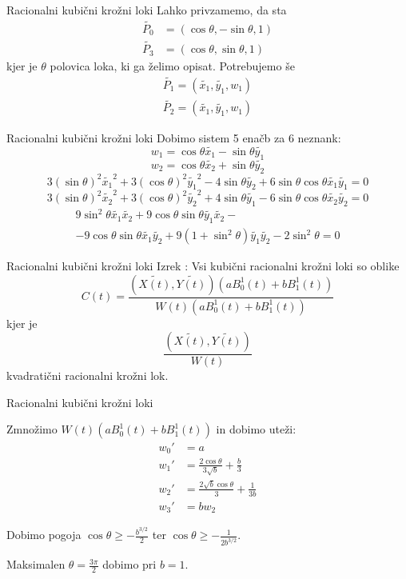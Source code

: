 \documentclass[t]{beamer}
\begin{document}
\begin{frame}{Racionalni kubični krožni loki}
Lahko privzamemo, da sta 
\begin{align*}
\tilde{P_{0}} &= (\cos \theta, - \sin \theta, 1) \\
\tilde{P_{3}} &= (\cos \theta, \sin \theta, 1)
\end{align*}
kjer je $\theta$ polovica loka, ki ga želimo opisat. 
Potrebujemo še 
\begin{align*}
\tilde{P_{1}} = (\tilde{x_{1}}, \tilde{y_{1}}, w_{1}) \\
\tilde{P_{2}} = (\tilde{x_{1}}, \tilde{y_{1}}, w_{1})
\end{align*}

\end{frame}

\begin{frame}{Racionalni kubični krožni loki}
Dobimo sistem 5 enačb za 6 neznank:
$$
w_{1} = \cos \theta \tilde{x_{1}} - \sin \theta  \tilde{y_{1}} 
$$
$$
w_{2} = \cos \theta  \tilde{x_{2}} + \sin \theta  \tilde{y_{2}} 
$$
$$
3(\sin \theta )^{2} \tilde{x_{1}}^2 + 3(\cos \theta )^{2} \tilde{y_{1}}^2 - 4 \sin \theta \tilde{y_{2}} + 6\sin \theta \cos \theta \tilde{x_{1}}\tilde{y_{1}} = 0 
$$
$$
3(\sin \theta )^{2} \tilde{x_{2}}^2 + 3(\cos \theta )^{2} \tilde{y_{2}}^2 + 4 \sin \theta 
\tilde{y_{1}} - 6\sin \theta \cos \theta \tilde{x_{2}}\tilde{y_{2}} = 0 
$$
\begin{align*}
9\sin^{2}\theta \tilde{x_{1}}\tilde{x_{2}} + 9 \cos \theta \sin \theta \tilde{y_{1}}\tilde{x_{2}} -\\ -9\cos \theta \sin \theta \tilde{x_{1}} \tilde{y_{2}} + 9 (1 + \sin^2 \theta) \tilde{y_{1}} \tilde{y_{2}} - 2\sin^2\theta = 0
\end{align*}

\end{frame}

\begin{frame}{Racionalni kubični krožni loki}
Izrek : Vsi kubični racionalni krožni loki so oblike 
$$
C(t) = \frac{(\tilde{X(t)}, \tilde{Y(t)})(aB_{0}^1(t) + bB_{1}^1(t))}{W(t)(aB_{0}^1(t) + bB_{1}^1(t))}
$$
kjer je 
$$
\frac{(\tilde{X(t)}, \tilde{Y(t)})}{W(t)}
$$
kvadratični racionalni krožni lok.
\end{frame}

\begin{frame}{Racionalni kubični krožni loki}

Zmnožimo $W(t)(aB_{0}^1(t) + bB_{1}^1(t))$ in dobimo uteži:
\begin{align*}
w_{0}' &= a \\
w_{1}' &=  \frac{2 \cos \theta}{3 \sqrt{b}} + \frac{b}{3} \\
w_{2}' &=  \frac{2 \sqrt{b} \cos \theta}{3} + \frac{1}{3b} \\
w_{3}' &= b w_{2} 
\end{align*}

Dobimo pogoja $\cos \theta \geq - \frac{b^{3/2}}{2}$ ter $\cos \theta \geq - \frac{1}{2b^{3/2}}$.

Maksimalen $\theta = \frac{3\pi}{2}$ dobimo pri $b = 1$. 

\end{frame}
\end{document}
